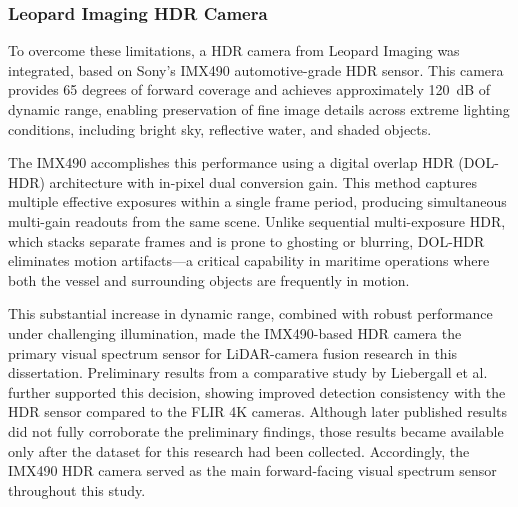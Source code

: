 \documentclass{erauthesis}
\begin{document}
\subsubsection{Leopard Imaging HDR Camera}

To overcome these limitations, a \ac{HDR} camera from Leopard Imaging was integrated, based on Sony’s IMX490 automotive-grade \ac{HDR} sensor.  
This camera provides 65 degrees of forward coverage and achieves approximately 120~dB of dynamic range, enabling preservation of fine image details across extreme lighting conditions, including bright sky, reflective water, and shaded objects.  

The IMX490 accomplishes this performance using a digital overlap \ac{HDR} (DOL-HDR) architecture with in-pixel dual conversion gain.  
This method captures multiple effective exposures within a single frame period, producing simultaneous multi-gain readouts from the same scene.  
Unlike sequential multi-exposure \ac{HDR}, which stacks separate frames and is prone to ghosting or blurring, DOL-\ac{HDR} eliminates motion artifacts—a critical capability in maritime operations where both the vessel and surrounding objects are frequently in motion.  

This substantial increase in dynamic range, combined with robust performance under challenging illumination, made the IMX490-based \ac{HDR} camera the primary visual spectrum sensor for \ac{LiDAR}-camera fusion research in this dissertation.  
Preliminary results from a comparative study by Liebergall et al.~\cite{liebergall} further supported this decision, showing improved detection consistency with the \ac{HDR} sensor compared to the FLIR 4K cameras.  
Although later published results did not fully corroborate the preliminary findings, those results became available only after the dataset for this research had been collected.  
Accordingly, the IMX490 \ac{HDR} camera served as the main forward-facing visual spectrum sensor throughout this study.  
\end{document}
